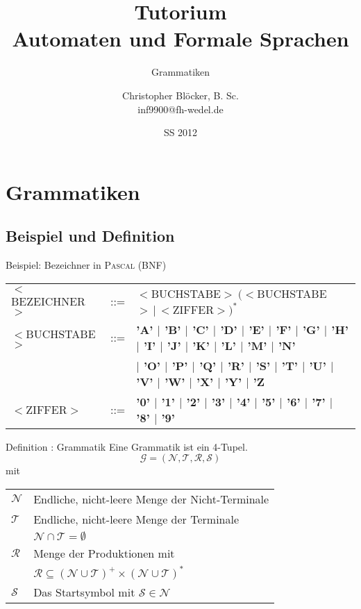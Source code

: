 \documentclass[]{beamer}
\author[Christopher Blöcker, B. Sc.]{Christopher Blöcker, B. Sc.\\ inf9900@fh-wedel.de}
\title[AFS Tutorium]{Tutorium\\Automaten und Formale Sprachen}
\date{SS 2012}
\subtitle{Grammatiken}
\begin{document}
\begin{frame}
  \titlepage
\end{frame}

\section{Grammatiken}
\subsection{Beispiel und Definition}
\begin{frame}[squeeze]{}
  \begin{exampleblock}{Beispiel: Bezeichner in \textsc{Pascal} (BNF)}
    \begin{tiny}
      \begin{tabular}{l c l}
        $<$BEZEICHNER$>$ & ::= & $<$BUCHSTABE$>~(<$BUCHSTABE$>\,|\,<$ZIFFER$>)^*$ \\
        $<$BUCHSTABE$>$  & ::= & \textbf{\hspace*{3pt} 'A' $|$ 'B' $|$ 'C' $|$ 'D' $|$ 'E' $|$ 'F' $|$ 'G' $|$ 'H' $|$ 'I' $|$ 'J' $|$ 'K' $|$ 'L' $|$ 'M' $|$ 'N'} \\
                         &     & \textbf{$|$ 'O' $|$ 'P' $|$ 'Q' $|$ 'R' $|$ 'S' $|$ 'T' $|$ 'U' $|$ 'V' $|$ 'W' $|$ 'X' $|$ 'Y' $|$ 'Z} \\
        $<$ZIFFER$>$     & ::= & \textbf{'0' $|$ '1' $|$ '2' $|$ '3' $|$ '4' $|$ '5' $|$ '6' $|$ '7' $|$ '8' $|$ '9'} \\
      \end{tabular}
    \end{tiny}
  \end{exampleblock}
  
  \pause
  
  \begin{block}{Definition : Grammatik}
    Eine Grammatik ist ein 4-Tupel.
    \[\mathcal{G = \left( N, T, R, S \right)}\]
    mit \\
    \vspace*{1em}
    \begin{tabular}{l l}
       $\mathcal{N}$ & Endliche, nicht-leere Menge der Nicht-Terminale \\
       $\mathcal{T}$ & Endliche, nicht-leere Menge der Terminale \\
                     & $\mathcal{N} \cap \mathcal{T} = \emptyset$ \\
       $\mathcal{R}$ & Menge der Produktionen mit \\ 
                     & $\mathcal{R} \subseteq \left( \mathcal{N} \cup \mathcal{T} \right)^+ \times \left( \mathcal{N} \cup \mathcal{T} \right)^*$ \\
       $\mathcal{S}$ & Das Startsymbol mit $\mathcal{S} \in \mathcal{N}$ \\
    \end{tabular}
  \end{block}
\end{frame}
\end{document}
